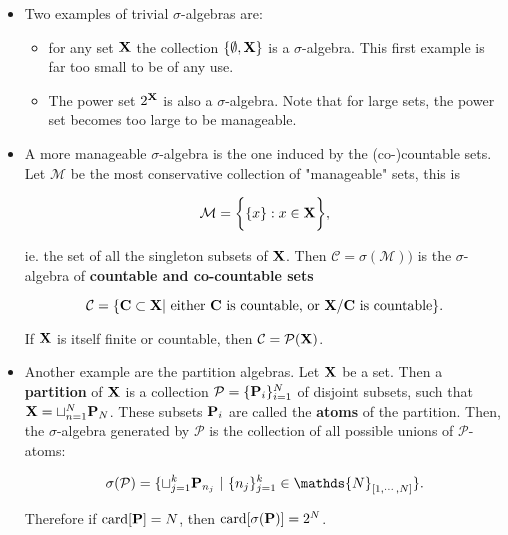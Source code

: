 \documentclass{homework}
\begin{document}
\begin{itemize}
    \item Two examples of trivial $\sigma$-algebras are:
    \begin{itemize}
        \item for any set ${\bf X}$ the collection $\{\emptyset, {\bf X}\}$ is a $\sigma$-algebra. This first example is far too small to be of any use.
        \item The power set $2^{\bf X}$ is also a $\sigma$-algebra. Note that for large sets, the power set becomes too large to be manageable.\\
    \end{itemize}
    
    \item A more manageable $\sigma$-algebra is the one induced by the (co-)countable sets. Let $\mathcal{M}$ be the most conservative collection of "manageable" sets, this is 
    
    $$
    \mathcal{M} = \bigg\{\{x\}: x \in {\bf X} \bigg\},
    $$
    
    ie. the set of all the singleton subsets of ${\bf X}$. Then $\mathcal{C} = \sigma(\mathcal{M}))$ is the $\sigma$-algebra of \textbf{countable and co-countable sets} 
    
    $$
    \mathcal{C} = \{{\bf C} \subset {\bf X} | \textnormal{ either } {\bf C} \textnormal{ is countable, or } {\bf X}/{\bf C} \textnormal{ is countable}\}.
    $$
    
    If ${\bf X}$ is itself finite or countable, then $\mathcal{C} = \mathcal{P}({\bf X})$. \\
    
    \item Another example are the partition algebras. Let ${\bf X}$ be a set. Then a \textbf{partition} of ${\bf X}$ is a collection $\mathcal{P} = \{{\bf P}_i\}_{i=1}^{N}$ of disjoint subsets, such that ${\bf X}= \sqcup_{n=1}^{N} {\bf P}_N$. These subsets ${\bf P}_i$ are called the \textbf{atoms} of the partition. Then, the $\sigma$-algebra generated by $\mathcal{P}$ is the collection of all possible unions of $\mathcal{P}$-atoms:
    
    $$
    \sigma(\mathcal{P}) = \{\sqcup_{j=1}^{k}{\bf P}_{n_j}\textnormal{ }|\textnormal{ } \{n_j\}_{j=1}^{k} \in \mathds{N}_{[1, \cdots, N]}\}.
    $$
    
    Therefore if $\textnormal{card}[{\bf P}] = N$, then $\textnormal{card}[\sigma({\bf P})] = 2^N$. \\
    

\end{itemize}
\end{document}

